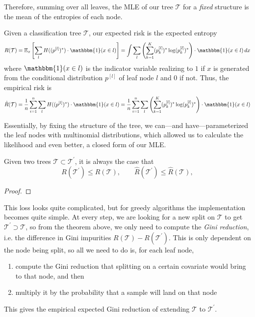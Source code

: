   Therefore, summing over all leaves, the MLE of our tree $\mathcal{T}$ for a \textit{fixed} structure is the mean of the entropies of each node. 

  \begin{theorem}
    \label{thm:entropy-risk-of-classification-tree}
    Given a classification tree $\mathcal{T}$, our expected risk is the expected entropy 
    \begin{equation}
      R(\mathcal{T}) = \mathbb{E}_x \left[ \sum_l H((p^{[l]})^\ast) \cdot \mathbbm{1}(x \in l) \right] = \int \sum_l \left( \sum_{k=1}^K (p_k^{[l]})^\ast \log (p_k^{[l]})^\ast \right) \cdot \mathbbm{1}(x \in l) \,dx 
    \end{equation}
    where $\mathbbm{1}(x \in l)$ is the indicator variable realizing to $1$ if $x$ is generated from the conditional distribution $p^{[l]}$ of leaf node $l$ and $0$ if not. Thus, the empirical risk is 
    \begin{equation}
      \hat{R}(\mathcal{T}) = \frac{1}{n} \sum_{i=1}^n \sum_{l} H( (p^{[l]})^\ast) \cdot \mathbbm{1}(x \in l) = \frac{1}{n} \sum_{i=1}^n \sum_{l} \left( \sum_{k=1}^K (p_k^{[l]})^\ast \log (p_k^{[l]})^\ast \right) \cdot \mathbbm{1}(x \in l)
    \end{equation}
  \end{theorem}

  Essentially, by fixing the structure of the tree, we can---and have---parameterized the leaf nodes with multinomial distributions, which allowed us to calculate the likelihood and even better, a closed form of our MLE. 

  \begin{theorem}
    \label{thm:entropy-risk-is-nondecreasing}
    Given two trees $\mathcal{T} \subset \mathcal{T}^\prime$, it is always the case that 
    \begin{equation}
      R(\mathcal{T}^\prime) \leq R(\mathcal{T}), \qquad \hat{R}(\mathcal{T}^\prime) \leq \hat{R}(\mathcal{T}), 
    \end{equation}
  \end{theorem}
  \begin{proof}
    
  \end{proof}

  This loss looks quite complicated, but for greedy algorithms the implementation becomes quite simple. At every step, we are looking for a new split on $\mathcal{T}$ to get $\mathcal{T}^\prime \supset \mathcal{T}$, so from the theorem above, we only need to compute the \textit{Gini reduction}, i.e. the difference in Gini impurities $R(\mathcal{T}) - R(\mathcal{T}^\prime)$. This is only dependent on the node being split, so all we need to do is, for each leaf node, 
  \begin{enumerate}
    \item compute the Gini reduction that splitting on a certain covariate would bring to that node, and then 
    \item multiply it by the probability that a sample will land on that node
  \end{enumerate} 
  This gives the empirical expected Gini reduction of extending $\mathcal{T}$ to $\mathcal{T}^\prime$. 


